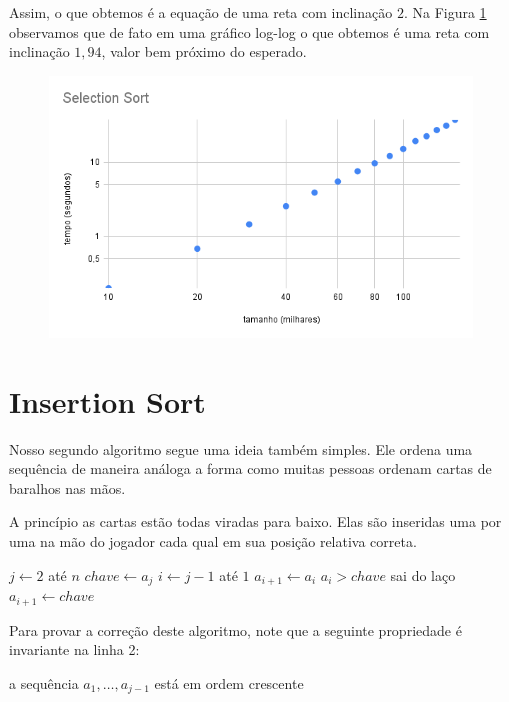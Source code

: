   Assim, o que obtemos é a equação de uma reta com inclinação $2$.
  Na Figura \ref{} observamos que de fato em uma gráfico log-log o que obtemos é uma reta com inclinação $1,94$, valor bem próximo do esperado.

  \begin{figure}
    \includegraphics[width=\textwidth]{imagens/SelectionSort2.png}
  \end{figure}

  
  \section{Insertion Sort}

  Nosso segundo algoritmo segue uma ideia também simples.
  Ele ordena uma sequência de maneira análoga a forma como muitas pessoas ordenam cartas de baralhos nas mãos.

  A princípio as cartas estão todas viradas para baixo.
  Elas são inseridas uma por uma na mão do jogador cada qual em sua posição relativa correta.

   \begin{codebox}
     \li \For $j \gets 2$ até $n$
     \li $chave \gets a_j$
     \li    \For $i \gets j-1$ até $1$
     \li    \Do $a_{i+1} \gets a_i$
     \li       \If $a_i > chave$
     \li       \Then sai do laço
               \End
            \End
     \li    $a_{i+1} \gets chave$
     \End
   \end{codebox}

   Para provar a correção deste algoritmo, note que a seguinte propriedade é invariante na linha 2:

   \begin{center}
     a sequência $a_1, \dots, a_{j-1}$ está em ordem crescente
   \end{center}


